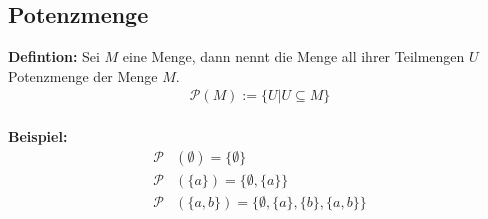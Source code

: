 \documentclass[../AbiMappe_Mathe.tex]{subfiles}
\begin{document}
\subsection{Potenzmenge}
\textbf{Defintion:} Sei $M$ eine Menge, dann nennt die Menge all ihrer Teilmengen $U$ Potenzmenge der Menge $M$.
\begin{align*}
\mathcal{P}(M) := \{U|U \subseteq M  \}
\end{align*}
\\\textbf{Beispiel:} 
\begin{align*}
\mathcal P&(\emptyset) = \{ \emptyset \}\\
\mathcal P&(\{ a \}) = \bigl\{ \emptyset, \{ a \} \bigr\}\\
\mathcal P&(\{ a, b \}) = \bigl\{ \emptyset, \{ a \}, \{ b \}, \{ a, b \} \bigr\}\\
\end{align*}
\end{document}
